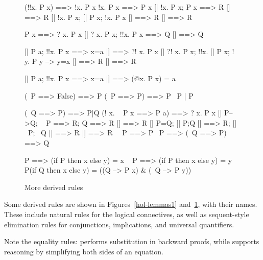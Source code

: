 \begin{figure}
\begin{ttbox}\makeatother
{}      (!!x. P x) ==> !x. P x
      !x. P x ==> P x
      [| !x. P x;  P x ==> R |] ==> R
  [| !x. P x;  [| P x; !x. P x |] ==> R |] ==> R

       P x ==> ? x. P x
       [| ? x. P x; !!x. P x ==> Q |] ==> Q

      [| P a;  !!x. P x ==> x=a |] ==> ?! x. P x
      [| ?! x. P x;  !!x. [| P x;  ! y. P y --> y=x |] ==> R 
          |] ==> R

 [| P a;  !!x. P x ==> x=a |] ==> (@x. P x) = a

          (~P ==> False) ==> P
       (~P ==> P) ==> P
 ~P | P

          (~Q ==> P) ==> P|Q
            (! x. ~ P x ==> P a) ==> ? x. P x
           [| P-->Q; ~ P ==> R; Q ==> R |] ==> R
           [| P=Q;  [| P;Q |] ==> R;  [| ~P; ~Q |] ==> R |] ==> R
         ~~P ==> P
            ~P ==> (~Q ==> P) ==> Q

            P ==> (if P then x else y) = x
        ~ P ==> (if P then x else y) = y
        P(if Q then x else y) = ((Q --> P x) & (~Q --> P y))
\end{ttbox}
\caption{More derived rules} \label{hol-lemmas2}
\end{figure}

Some derived rules are shown in Figures~\ref{hol-lemmas1}
and~\ref{hol-lemmas2}, with their {\ML} names.  These include natural rules
for the logical connectives, as well as sequent-style elimination rules for
conjunctions, implications, and universal quantifiers.  

Note the equality rules:  performs substitution in
backward proofs, while  supports reasoning by
simplifying both sides of an equation.

